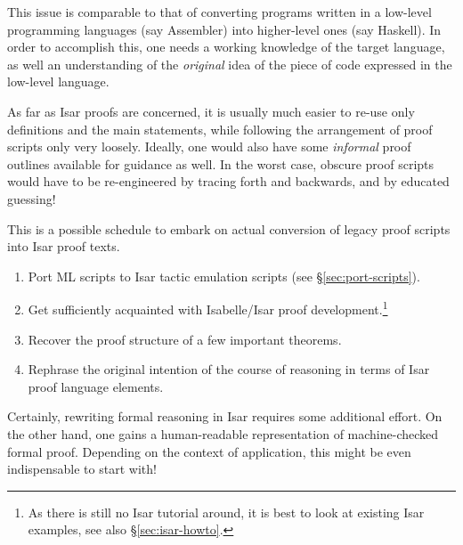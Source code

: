 This issue is comparable to that of converting programs written in a low-level
programming languages (say Assembler) into higher-level ones (say Haskell).
In order to accomplish this, one needs a working knowledge of the target
language, as well an understanding of the \emph{original} idea of the piece of
code expressed in the low-level language.

As far as Isar proofs are concerned, it is usually much easier to re-use only
definitions and the main statements, while following the arrangement of proof
scripts only very loosely.  Ideally, one would also have some \emph{informal}
proof outlines available for guidance as well.  In the worst case, obscure
proof scripts would have to be re-engineered by tracing forth and backwards,
and by educated guessing!

\medskip This is a possible schedule to embark on actual conversion of legacy
proof scripts into Isar proof texts.

\begin{enumerate}

\item Port ML scripts to Isar tactic emulation scripts (see
  \S\ref{sec:port-scripts}).

\item Get sufficiently acquainted with Isabelle/Isar proof
  development.\footnote{As there is still no Isar tutorial around, it is best
    to look at existing Isar examples, see also \S\ref{sec:isar-howto}.}

\item Recover the proof structure of a few important theorems.

\item Rephrase the original intention of the course of reasoning in terms of
  Isar proof language elements.

\end{enumerate}

Certainly, rewriting formal reasoning in Isar requires some additional effort.
On the other hand, one gains a human-readable representation of
machine-checked formal proof.  Depending on the context of application, this
might be even indispensable to start with!

